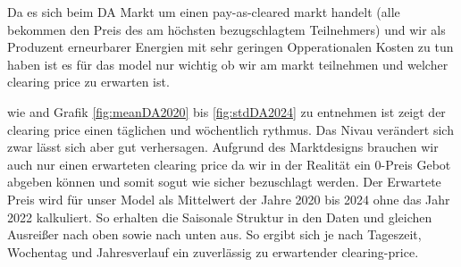 Da es sich beim DA Markt um einen pay-as-cleared markt handelt (alle bekommen den Preis des am höchsten bezugschlagtem Teilnehmers)
und wir als Produzent erneurbarer Energien mit sehr geringen Opperationalen Kosten zu tun haben ist es für das model nur wichtig ob
wir am markt teilnehmen und welcher clearing price zu erwarten ist.

wie and Grafik \ref{fig:meanDA2020} bis \ref{fig:stdDA2024}      zu entnehmen ist zeigt der clearing price einen täglichen und wöchentlich  rythmus.
Das Nivau verändert sich zwar lässt sich aber gut verhersagen. Aufgrund des Marktdesigns brauchen wir auch nur einen erwarteten clearing price
da wir in der Realität ein 0-Preis Gebot abgeben können und somit sogut wie sicher bezuschlagt werden.
Der Erwartete Preis wird für unser Model als Mittelwert der Jahre 2020 bis 2024 ohne das Jahr 2022 kalkuliert. So erhalten die
Saisonale Struktur in den Daten und gleichen Ausreißer nach oben sowie nach unten aus. So ergibt sich je nach Tageszeit, Wochentag und Jahresverlauf ein zuverlässig
zu erwartender clearing-price.

